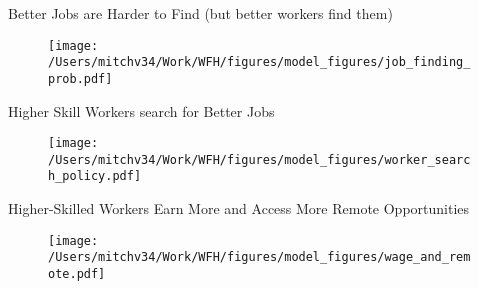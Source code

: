 \documentclass[aspectratio=1610]{beamer}
\begin{document}
\begin{frame}{Better Jobs are Harder to Find (but better workers find them)}
    \begin{figure}
        \centering
        \texttt{[image: /Users/mitchv34/Work/WFH/figures/model\_figures/job\_finding\_prob.pdf]}
    \end{figure}
\end{frame}

\begin{frame}{Higher Skill Workers search for Better Jobs}
    \begin{figure}
        \centering
        \texttt{[image: /Users/mitchv34/Work/WFH/figures/model\_figures/worker\_search\_policy.pdf]}
    \end{figure}
\end{frame}

\begin{frame}{Higher-Skilled Workers Earn More and Access More Remote Opportunities}
    \begin{figure}
        \centering
        \texttt{[image: /Users/mitchv34/Work/WFH/figures/model\_figures/wage\_and\_remote.pdf]}
    \end{figure}
\end{frame}
\end{document}
